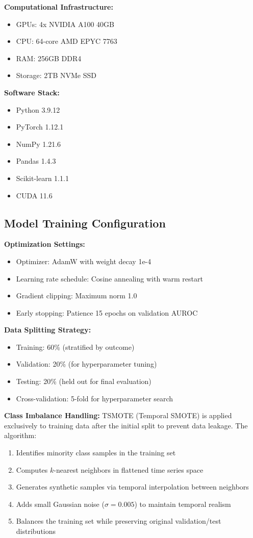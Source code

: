 \documentclass[letterpaper]{article}
\begin{document}
\textbf{Computational Infrastructure:}
\begin{itemize}
    \item GPUs: 4x NVIDIA A100 40GB
    \item CPU: 64-core AMD EPYC 7763
    \item RAM: 256GB DDR4
    \item Storage: 2TB NVMe SSD
\end{itemize}

\textbf{Software Stack:}
\begin{itemize}
    \item Python 3.9.12
    \item PyTorch 1.12.1
    \item NumPy 1.21.6
    \item Pandas 1.4.3
    \item Scikit-learn 1.1.1
    \item CUDA 11.6
\end{itemize}

\subsection{Model Training Configuration}

\textbf{Optimization Settings:}
\begin{itemize}
    \item Optimizer: AdamW with weight decay 1e-4
    \item Learning rate schedule: Cosine annealing with warm restart
    \item Gradient clipping: Maximum norm 1.0
    \item Early stopping: Patience 15 epochs on validation AUROC
\end{itemize}

\textbf{Data Splitting Strategy:}
\begin{itemize}
    \item Training: 60\% (stratified by outcome)
    \item Validation: 20\% (for hyperparameter tuning)
    \item Testing: 20\% (held out for final evaluation)
    \item Cross-validation: 5-fold for hyperparameter search
\end{itemize}

\textbf{Class Imbalance Handling:} 
TSMOTE (Temporal SMOTE) is applied exclusively to training data after the initial split to prevent data leakage. The algorithm:
\begin{enumerate}
    \item Identifies minority class samples in the training set
    \item Computes $k$-nearest neighbors in flattened time series space
    \item Generates synthetic samples via temporal interpolation between neighbors
    \item Adds small Gaussian noise ($\sigma = 0.005$) to maintain temporal realism
    \item Balances the training set while preserving original validation/test distributions
\end{enumerate}
\end{document}
